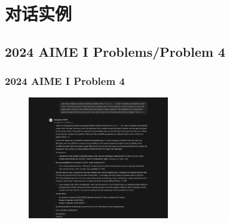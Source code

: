 \section{对话实例}


\subsection{2024 AIME I Problems/Problem 4}

\begin{frame}
\frametitle{2024 AIME I Problem 4}
\begin{figure}
    \centering
    \includegraphics[width=0.55\textwidth]{./pic/2.png} %
    \label{fig:aime_problem_1}
\end{figure}
\end{frame}

